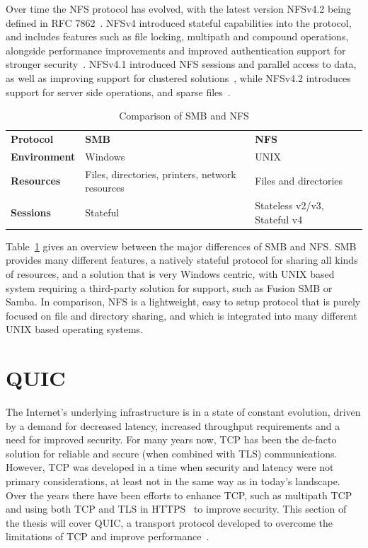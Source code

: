 \documentclass[english, 12pt, a4paper, elec, utf8, a-2b, online]{aaltothesis}
\begin{document}
Over time the NFS protocol has evolved, with the latest version NFSv4.2 being
defined in RFC 7862~\cite{rfc7862}. NFSv4 introduced stateful capabilities into the protocol, and
includes features such as file locking, multipath and compound operations, alongside performance
improvements and improved authentication support for stronger security~\cite{rfc7530}.
NFSv4.1 introduced NFS sessions and parallel access to data, as well as improving support
for clustered solutions~\cite{rfc8881}, while
NFSv4.2 introduces support for server side operations, and sparse files~\cite{rfc7862}.

\begin{table}[h]
	\centering
	\caption{Comparison of SMB and NFS}
	\label{tab:smb_nfs}
	\begin{tabular}{lll}
	\textbf{Protocol} & \textbf{SMB} & \textbf{NFS} \\
	\textbf{Environment}    & Windows     & UNIX    \\
	\textbf{Resources} &  Files, directories, printers, network resources   & Files and directories     \\
	\textbf{Sessions}  & Stateful  & Stateless v2/v3, Stateful v4    \\
	\end{tabular}
\end{table}

Table~\ref{tab:smb_nfs} gives an overview between the major differences of SMB and
NFS. SMB provides many different features, a natively stateful protocol for sharing
all kinds of resources, and a solution that is very Windows centric, with UNIX based
system requiring a third-party solution for support, such as Fusion SMB or
Samba. In comparison, NFS is a lightweight, easy to setup protocol that is purely
focused on file and directory sharing, and which is integrated into many
different UNIX based operating systems.
\clearpage

\section{QUIC}
\label{sec:quic}
The Internet's underlying infrastructure is in a state of constant evolution,
driven by a demand for decreased latency, increased throughput requirements and
a need for improved security. For many years now, TCP has been the de-facto
solution for reliable and secure (when combined with TLS) communications. However,
TCP was developed in a time when security and latency were not primary considerations,
at least not in the same way as in today's landscape. Over the years there have
been efforts to enhance TCP, such as multipath TCP~\cite{rfc8684} and using both
TCP and TLS in HTTPS~\cite{rfc2818} to improve security. This section of the thesis
will cover QUIC, a transport protocol developed to overcome the limitations of TCP
and improve performance~\cite{quic_transport_protocol_design}.
\end{document}
